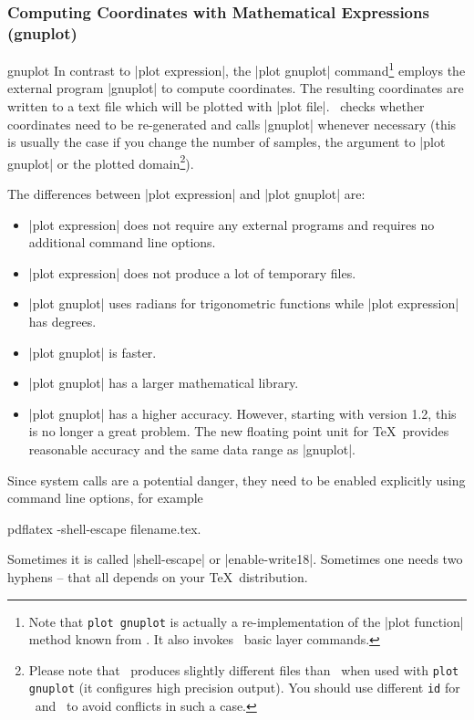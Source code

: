 {\subsubsection{Computing Coordinates with Mathematical Expressions (gnuplot)}

\begin{addplotoperation}[]{gnuplot}{}
In contrast to |plot expression|, the |plot gnuplot| command\footnote{Note that \texttt{plot gnuplot} is actually a re-implementation of the |plot function| method known from \PGF. It also invokes \PGF\ basic layer commands.} employs the external program |gnuplot| to compute coordinates. The resulting coordinates are written to a text file which will be plotted with |plot file|. \PGF\ checks whether coordinates need to be re-generated and calls |gnuplot| whenever necessary (this is usually the case if you change the number of samples, the argument to |plot gnuplot| or the plotted domain\footnote{Please note that \PGFPlots\ produces slightly different files than \Tikz\ when used with \texttt{plot gnuplot} (it configures high precision output). You should use different \texttt{id} for \PGFPlots\ and \Tikz\ to avoid conflicts in such a case.}).

The differences between |plot expression| and |plot gnuplot| are:
\begin{itemize}
	\item |plot expression| does not require any external programs and requires no additional command line options.
	\item |plot expression| does not produce a lot of temporary files.
	\item |plot gnuplot| uses radians for trigonometric functions while |plot expression| has degrees.
	\item |plot gnuplot| is faster.
	\item |plot gnuplot| has a larger mathematical library.
	\item |plot gnuplot| has a higher accuracy. However, starting with version 1.2, this is no longer a great problem. The new floating point unit for \TeX\ provides reasonable accuracy and the same data range as |gnuplot|.
\end{itemize}

Since system calls are a potential danger, they need to be enabled explicitly using command line options, for example
\begin{codeexample}
pdflatex -shell-escape filename.tex.
\end{codeexample}
Sometimes it is called |shell-escape| or |enable-write18|. Sometimes one needs two hyphens -- that all depends on your \TeX\ distribution.
\begin{codeexample}[]
\end{codeexample}


\end{addplotoperation}}
